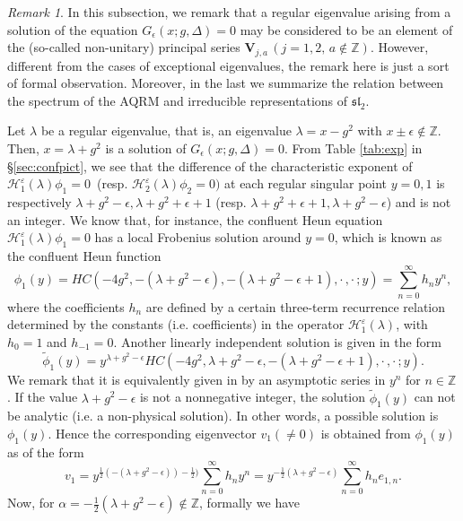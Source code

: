 \documentclass[11pt]{article}
\numberwithin{equation}{section}
\newcommand{\Z}{\mathbb{Z}} %
\newcommand{\e}{\varepsilon}
\theoremstyle{plain}
\theoremstyle{definition}
\theoremstyle{remark}
\newtheorem{rem}{Remark}[section]
\begin{document}
\begin{rem}
In this subsection, we remark that a regular eigenvalue arising from a solution of the equation $G_\epsilon(x;g, \Delta)=0$ may be considered to be an element of the (so-called non-unitary) principal series $\mathbf{V}_{j,a}\, (j=1,2,\, a\not \in \Z)$. However, different from the cases of exceptional eigenvalues, the remark here is just a sort of formal observation. Moreover, in the last we summarize the relation between the spectrum of the AQRM and irreducible representations of $\mathfrak{sl}_2$. 

Let $\lambda$ be a regular eigenvalue, that is, an eigenvalue $\lambda= x-g^2$ with  $x \pm \epsilon \notin \mathbb{Z}$. 
Then, $x=\lambda+g^2$ is a solution of $G_\epsilon(x;g, \Delta)=0$. From Table \ref{tab:exp} in \S \ref{sec:confpict}, we see that the difference of the characteristic exponent of $\mathcal{H}_1^{\e}(\lambda)\phi_1=0$\, (resp. $\mathcal{H}_2^{\e}(\lambda)\phi_2=0)$ at each regular singular point $y=0, 1$ is respectively $\lambda+g^2-\epsilon, \lambda+g^2+\epsilon+1$ (resp. $\lambda+g^2+\epsilon+1, \lambda+g^2-\epsilon$) and is not an integer. 
We know that, for instance, the confluent Heun equation $\mathcal{H}_1^{\e}(\lambda)\phi_1=0$ 
has a local Frobenius solution around $y=0$, which is known \cite{Heun2008} as the confluent Heun function 
\[
  \phi_1(y)=HC(-4g^2,-(\lambda+g^2-\epsilon), -(\lambda+g^2-\epsilon+1), \cdot\,,\cdot\,; y)= \sum_{n=0}^\infty h_n y^n,
\]
where the coefficients $h_n$ are defined by a certain three-term recurrence relation determined by the constants (i.e. coefficients) in the operator $\mathcal{H}_1^{\e}(\lambda)$, with $h_0=1$ and $h_{-1}=0$. Another linearly independent solution is given in the form
\[
  \tilde\phi_1(y)=y^{\lambda+g^2-\epsilon}HC(-4g^2, \lambda+g^2-\epsilon, -(\lambda+g^2-\epsilon+1), \cdot\,,\cdot\,; y).
\]
We remark that it is equivalently given in \cite{Heun2008} by an asymptotic series in  $y^{n}$ for $n\in \Z$. If the value $\lambda+g^2-\epsilon$ is not a nonnegative integer, the solution $\tilde\phi_1(y)$ can not be analytic (i.e. a non-physical solution). In other words, a possible solution is $\phi_1(y)$. Hence the corresponding eigenvector $v_1(\not=0)$ is obtained from $\phi_1(y)$ as of the form 
$$
v_1=y^{\frac12(-(\lambda+g^2-\epsilon))-\frac12)}\sum_{n=0}^\infty h_n y^n = 
y^{-\frac12(\lambda+g^2-\epsilon)}\sum_{n=0}^\infty h_ne_{1,n}.
$$
Now, for $\alpha=-\frac12(\lambda+g^2-\epsilon)\not\in \mathbb{Z}$, formally we have 

\end{rem}
\end{document}
